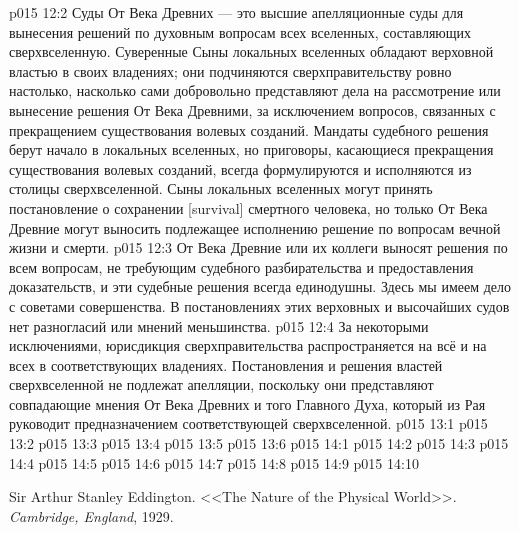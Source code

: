 \vs p015 12:2 Суды От Века Древних --- это высшие апелляционные суды для вынесения решений по духовным вопросам всех вселенных, составляющих сверхвселенную. Суверенные Сыны локальных вселенных обладают верховной властью в своих владениях; они подчиняются сверхправительству ровно настолько, насколько сами добровольно представляют дела на рассмотрение или вынесение решения От Века Древними, за исключением вопросов, связанных с прекращением существования волевых созданий. Мандаты судебного решения берут начало в локальных вселенных, но приговоры, касающиеся прекращения существования волевых созданий, всегда формулируются и исполняются из столицы сверхвселенной. Сыны локальных вселенных могут принять постановление о сохранении [survival] смертного человека, но только От Века Древние могут выносить подлежащее исполнению решение по вопросам вечной жизни и смерти.
\vs p015 12:3 От Века Древние или их коллеги выносят решения по всем вопросам, не требующим судебного разбирательства и предоставления доказательств, и эти судебные решения всегда единодушны. Здесь мы имеем дело с советами совершенства. В постановлениях этих верховных и высочайших судов нет разногласий или мнений меньшинства.
\vs p015 12:4 За некоторыми исключениями, юрисдикция сверхправительства распространяется на всё и на всех в соответствующих владениях. Постановления и решения властей сверхвселенной не подлежат апелляции, поскольку они представляют совпадающие мнения От Века Древних и того Главного Духа, который из Рая руководит предназначением соответствующей сверхвселенной.
\vs p015 13:1 
\vs p015 13:2 
\vs p015 13:3 
\vs p015 13:4 \pc 
\vs p015 13:5 
\vs p015 13:6 
\vs p015 14:1 
\vs p015 14:2 
\vs p015 14:3 
\vs p015 14:4 
\vs p015 14:5 \pc 
\vs p015 14:6 
\vs p015 14:7 
\vs p015 14:8 
\vs p015 14:9 \pc 
\vsetoff
\vs p015 14:10 
\quizlink
\begin{thebibliography}{100}
Sir Arthur Stanley Eddington.
{<<The Nature of the Physical World>>.}
{\em Cambridge, England}, 1929.
\end{thebibliography}
